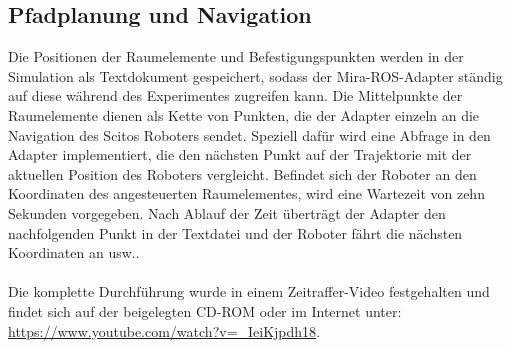 \subsection{Pfadplanung und Navigation}
Die Positionen der Raumelemente und Befestigungspunkten werden in der Simulation als Textdokument gespeichert, sodass der Mira-ROS-Adapter ständig auf diese während des Experimentes zugreifen kann. Die Mittelpunkte der Raumelemente dienen als Kette von Punkten, die der Adapter einzeln an die Navigation des Scitos Roboters sendet. Speziell dafür wird eine Abfrage in den Adapter implementiert, die den nächsten Punkt auf der Trajektorie mit der aktuellen Position des Roboters vergleicht. Befindet sich der Roboter an den Koordinaten des angesteuerten Raumelementes, wird eine Wartezeit von zehn Sekunden vorgegeben. Nach Ablauf der Zeit überträgt der Adapter den nachfolgenden Punkt in der Textdatei und der Roboter fährt die nächsten Koordinaten an usw.. \\ \\
Die komplette Durchführung wurde in einem Zeitraffer-Video festgehalten und findet sich auf der beigelegten CD-ROM oder im Internet unter: \url{https://www.youtube.com/watch?v=_IeiKjpdh18}.  
